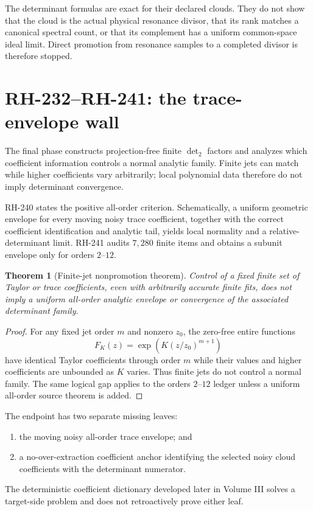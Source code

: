 \documentclass[11pt]{article}
\newtheorem{theorem}{Theorem}[section]
\theoremstyle{definition}
\theoremstyle{remark}
\begin{document}
The determinant formulas are exact for their declared clouds.  They do not
show that the cloud is the actual physical resonance divisor, that its rank
matches a canonical spectral count, or that its complement has a uniform
common-space ideal limit.  Direct promotion from resonance samples to a
completed divisor is therefore stopped.

\section{RH-232--RH-241: the trace-envelope wall}

The final phase constructs projection-free finite $\det_2$ factors and
analyzes which coefficient information controls a normal analytic family.
Finite jets can match while higher coefficients vary arbitrarily; local
polynomial data therefore do not imply determinant convergence.

RH-240 states the positive all-order criterion.  Schematically, a uniform
geometric envelope for every moving noisy trace coefficient, together with
the correct coefficient identification and analytic tail, yields local
normality and a relative-determinant limit.  RH-241 audits $7{,}280$ finite
items and obtains a subunit envelope only for orders $2$--$12$.

\begin{theorem}[Finite-jet nonpromotion theorem]\label{thm:jet}
Control of a fixed finite set of Taylor or trace coefficients, even with
arbitrarily accurate finite fits, does not imply a uniform all-order analytic
envelope or convergence of the associated determinant family.
\end{theorem}
\begin{proof}
For any fixed jet order $m$ and nonzero $z_0$, the zero-free entire functions
\[
 F_K(z)=\exp\!\left(K(z/z_0)^{m+1}\right)
\]
have identical Taylor coefficients through order $m$ while their values and
higher coefficients are unbounded as $K$ varies.  Thus finite jets do not
control a normal family.  The same logical gap applies to the orders
$2$--$12$ ledger unless a uniform all-order source theorem is added.
\end{proof}

The endpoint has two separate missing leaves:
\begin{enumerate}[label=(\roman*),leftmargin=2.2em]
\item the moving noisy all-order trace envelope; and
\item a no-over-extraction coefficient anchor identifying the selected noisy
cloud coefficients with the determinant numerator.
\end{enumerate}
The deterministic coefficient dictionary developed later in Volume III
solves a target-side problem and does not retroactively prove either leaf.
\end{document}
